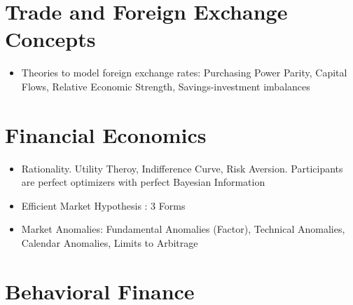 \documentclass[11pt, openany]{book}              %
\begin{document}
\section{Trade and Foreign Exchange Concepts}

\begin{itemize}
	\item Theories to model foreign exchange rates: Purchasing Power Parity, Capital Flows, Relative Economic Strength, Savings-investment imbalances
\end{itemize}


\section{Financial Economics}
\begin{itemize}
    \item Rationality. Utility Theroy, Indifference Curve, Risk Aversion. Participants are perfect optimizers with perfect Bayesian Information
    \item Efficient Market Hypothesis : 3 Forms
    \item Market Anomalies: Fundamental Anomalies (Factor), Technical Anomalies, Calendar Anomalies, Limits to Arbitrage 
\end{itemize}

\section{Behavioral Finance}
\end{document}
